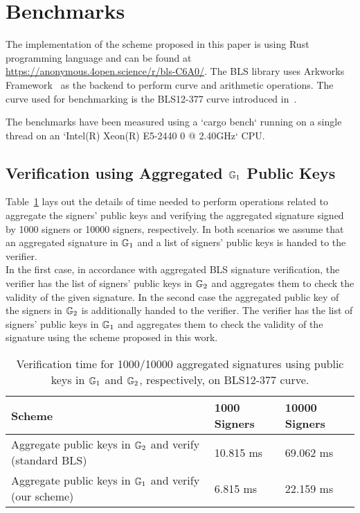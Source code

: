 \section{Benchmarks}
\label{sec:benchmarks}

The implementation of the scheme proposed in this paper is using Rust programming language and can be found at \url{https://anonymous.4open.science/r/bls-C6A0/}. 
The BLS library uses Arkworks Framework~\cite{arkworks.2022} as the backend to perform curve and arithmetic operations. The curve used for benchmarking is the BLS12-377 curve introduced in~\cite{bowe20_zexe}.

The benchmarks have been measured using a `cargo bench` running on a single thread on an `Intel(R) Xeon(R) E5-2440 0 @ 2.40GHz` CPU.

\subsection{Verification using Aggregated $\mathbb{G}_{1}$ Public Keys}
\label{sec:benchmark_aggregate_verify}

Table~\ref{tab:aggregated_signature_bench} lays out the details of time needed to perform operations related to aggregate the signers' public keys and verifying the aggregated signature signed by 1000 signers or 10000 
signers, respectively. In both scenarios we assume that an aggregated signature in $\mathbb{G}_{1}$ and a list of signers' public keys is handed to the verifier. \\

In the first case, in accordance with aggregated BLS signature verification, the verifier has the list of signers' public keys in $\mathbb{G}_{2}$ and aggregates them to check the validity of the given signature.
In the second case the aggregated public key of the signers in $\mathbb{G}_{2}$ is additionally handed to the verifier. The verifier has the list of signers' public keys in $\mathbb{G}_{1}$ and aggregates them to check the validity of the signature using the scheme proposed in this work.

\begin{table}[h!]
\begin{tabular}{| l | l | l |}

\hline

\textbf {Scheme} & \textbf {1000 Signers} & \textbf{10000 Signers} 	 \\
\hline
Aggregate public keys in $\mathbb{G}_{2}$ and verify (standard BLS) & 10.815 ms & 69.062 ms \\
\hline
Aggregate public keys in $\mathbb{G}_{1}$ and verify (our scheme)  & 6.815 ms & 22.159 ms \\
\hline
\end{tabular}
\caption{Verification time for 1000/10000 aggregated signatures using public keys in $\mathbb{G}_{1}$ and $\mathbb{G}_{2}$, respectively, on BLS12-377 curve.}
\label{tab:aggregated_signature_bench}
\end{table}

